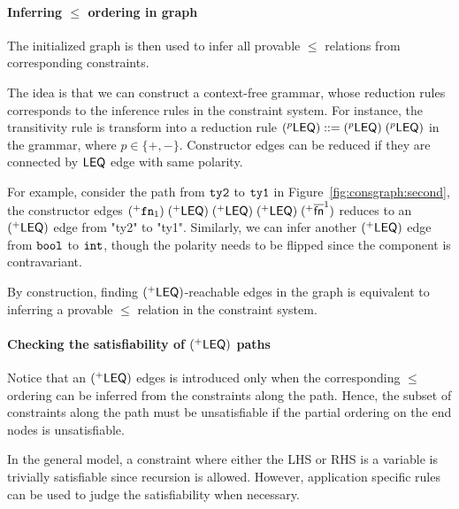 \paragraph{Inferring $\leq$ ordering in graph}

The initialized graph is then used to infer all provable $\leq$
relations from corresponding constraints.

The idea is that we can construct a context-free grammar, whose reduction
rules corresponds to the inference rules in the constraint system. For
instance, the transitivity rule is transform into a reduction rule
$(^{p}\mathsf{LEQ}) ::= (^{p}\mathsf{LEQ})\; (^{p}\mathsf{LEQ})$ in
the grammar, where $p\in \{+,-\}$. Constructor edges can be reduced
if they are connected by $\mathsf{LEQ}$ edge with same polarity.

For example, consider the path from $\mathtt{ty2}$ to $\mathtt{ty1}$ in
Figure~\ref{fig:consgraph:second}, the constructor edges
$(^{+}\mathtt{fn}_1)\; (^{+}\mathsf{LEQ})\; (^{+}\mathsf{LEQ})\;
(^{+}\mathsf{LEQ})\; (^{+}\overline{\textsf{fn}}^{1})$ reduces to an
$(^{+}\mathsf{LEQ})$ edge from "ty2" to "ty1".
Similarly, we can infer another $(^{+}\mathsf{LEQ})$ edge from
$\mathtt{bool}$ to $\mathtt{int}$, though the polarity needs to be flipped
since the component is contravariant.

By construction, finding $(^{+}\mathsf{LEQ})$-reachable edges in the
graph is equivalent to inferring a provable $\leq$ relation in the
constraint system.

\paragraph{Checking the satisfiability of $(^{+}\mathsf{LEQ})$ paths}

Notice that an $(^{+}\mathsf{LEQ})$ edges is introduced only when the
corresponding $\leq$ ordering can be inferred from the constraints
along the path. Hence, the subset of constraints along the path must
be unsatisfiable if the partial ordering on the end nodes is
unsatisfiable.

In the general model, a constraint where either the LHS or RHS is a
variable is trivially satisfiable since recursion is allowed. However,
application specific rules can be used to judge the satisfiability
when necessary.

